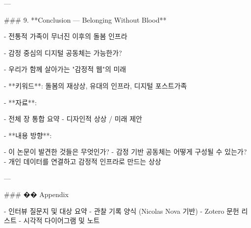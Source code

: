 ---

### 9. **Conclusion — Belonging Without Blood**

- 전통적 가족이 무너진 이후의 돌봄 인프라

- 감정 중심의 디지털 공동체는 가능한가?

- 우리가 함께 살아가는 "감정적 웹"의 미래

- **키워드**: 돌봄의 재상상, 유대의 인프라, 디지털 포스트가족

- **자료**:

  - 전체 장 통합 요약
  - 디자인적 상상 / 미래 제안

- **내용 방향**:

  - 이 논문이 발견한 것들은 무엇인가?
  - 감정 기반 공동체는 어떻게 구성될 수 있는가?
  - 개인 데이터를 연결하고 감정적 인프라로 만드는 상상

---

### �� Appendix

- 인터뷰 질문지 및 대상 요약
- 관찰 기록 양식 (Nicolas Nova 기반)
- Zotero 문헌 리스트
- 시각적 다이어그램 및 노트
